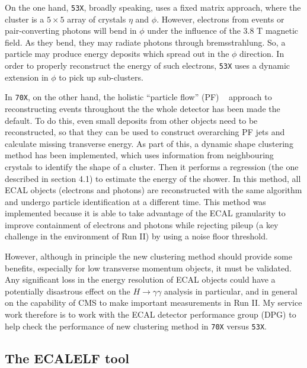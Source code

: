 \documentclass[10pt]{article}
\begin{document}
On the one hand, \texttt{53X}, broadly speaking, uses a fixed matrix approach, where the cluster is a $5\times5$ array of crystals $\eta$ and $\phi$. However, electrons from events or pair-converting photons will bend in $\phi$ under the influence of the 3.8 T magnetic field. As they bend, they may radiate photons through bremsstrahlung. So, a particle may produce energy deposits which spread out in the $\phi$ direction. In order to properly reconstruct the energy of such electrons, \texttt{53X} uses a dynamic extension in $\phi$ to pick up sub-clusters.

In \texttt{70X}, on the other hand, the holistic ``particle flow'' (PF) ~\cite{particleFlow} approach to reconstructing events throughout the the whole detector has been made the default. To do this, even small deposits from other objects need to be reconstructed, so that they can be used to construct overarching PF jets and calculate missing transverse energy. As part of this, a dynamic shape clustering method has been implemented, which uses information from neighbouring crystals to identify the shape of a cluster. Then it performs a regression (the one described in section 4.1) to estimate the energy of the shower. In this method, all ECAL objects (electrons and photons) are reconstructed with the same algorithm and undergo particle identification at a different time. This method was implemented because it is able to take advantage of the ECAL granularity to improve containment of electrons and photons while rejecting pileup (a key challenge in the environment of Run II) by using a noise floor threshold.

However, although in principle the new clustering method should provide some benefits, especially for low transverse momentum objects, it must be validated. Any significant loss in the energy resolution of ECAL objects could have a potentially disastrous effect on the $H \rightarrow \gamma \gamma$ analysis in particular, and in general on the capability of CMS to make important measurements in Run II. My service work therefore is to work with the ECAL detector performance group (DPG) to help check the performance of new clustering method in \texttt{70X} versus \texttt{53X}. 

\subsection{The ECALELF tool}
\end{document}
